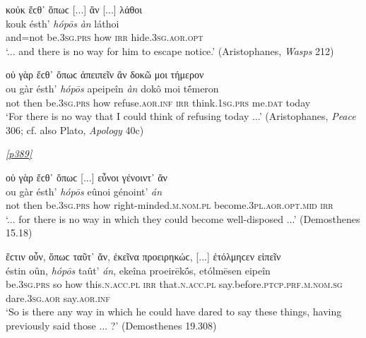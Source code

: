 \begin{exe}
\ex κοὐκ ἔϲθ᾽ ὅπωϲ {[}...{]} ἂν {[}...{]} λάθοι\\
\gll kouk ésth' \emph{hópōs} \emph{àn} láthoi\\
and=not be.\textsc{3sg.prs} how \textsc{irr} hide.\textsc{3sg.aor.opt}\\
\trans `... and there is no way for him to escape notice.' (Aristophanes, \textit{Wasps} 212)
\label{relan40}
\end{exe}

\begin{exe}
\ex οὐ γὰρ ἔϲθ᾽ ὅπωϲ ἀπειπεῖν ἂν δοκῶ μοι τήμερον\\
\gll ou gàr ésth' \emph{hópōs} apeipeîn \emph{àn} dokô moi tḗmeron\\
not then be.\textsc{3sg.prs} how refuse.\textsc{aor.inf} \textsc{irr} think.\textsc{1sg.prs} me.\textsc{dat} today\\
\trans `For there is no way that I could think of refusing today ...' (Aristophanes, \textit{Peace} 306; cf. also Plato, \textit{Apology} 40c)
\label{relan41}
\end{exe}

\hyperlink{p389}{\emph{[p389]}}

\begin{exe}
\ex οὐ γὰρ ἔϲθ᾽ ὅπωϲ {[}...{]} εὖνοι γένοιντ᾽ ἄν\\
\gll ou gàr ésth' \emph{hópōs} eûnoi génoint' \emph{án}\\
not then be.\textsc{3sg.prs} how right-minded.\textsc{m.nom.pl} become.\textsc{3pl.aor.opt.mid} \textsc{irr}\\
\trans `... for there is no way in which they could become well-disposed ...' (Demosthenes 15.18)
\label{relan42}
\end{exe}

\begin{exe}
\ex ἔϲτιν οὖν, ὅπωϲ ταῦτ᾽ ἄν, ἐκεῖνα προειρηκώϲ, {[}...{]} ἐτόλμηϲεν εἰπεῖν\\
\gll éstin oûn, \emph{hópōs} taût' \emph{án}, ekeîna proeirēkṓs, etólmēsen eipeîn\\
be.\textsc{3sg.prs} so how this.\textsc{n.acc.pl} \textsc{irr} that.\textsc{n.acc.pl} say.before.\textsc{ptcp.prf.m.nom.sg} dare.\textsc{3sg.aor} say.\textsc{aor.inf}\\
\trans `So is there any way in which he could have dared to say these things, having previously said those ... ?' (Demosthenes 19.308)
\label{relan43}
\end{exe}

